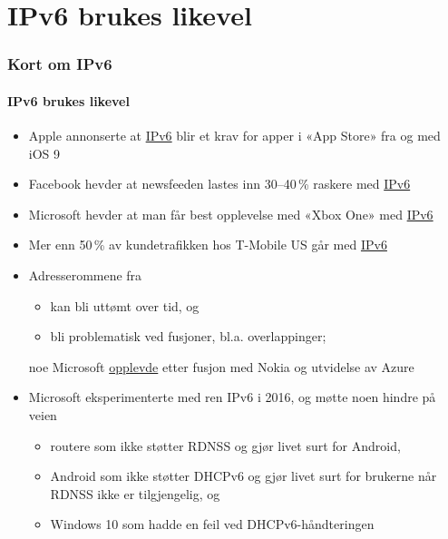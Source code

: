 \section{IPv6 brukes likevel}
\begin{frame}
  \frametitle{Kort om IPv6}
  \framesubtitle{IPv6 brukes likevel}
  \begin{itemize}
  \item Apple annonserte at
    \href{https://developer.apple.com/videos/wwdc/2015/?id=102}{IPv6}
    blir et krav for apper i «App Store» fra og med iOS 9
  \item Facebook hevder at newsfeeden lastes inn 30--40\,\% raskere
    med
    \href{https://www.youtube.com/watch?v=An7s25FSK0U&feature=youtu.be&t=18m54s}{IPv6}
  \item Microsoft hevder at man får best opplevelse med «Xbox One» med
    \href{http://www.internetsociety.org/deploy360/blog/2013/10/microsoft-the-best-xbox-one-gaming-experience-will-be-over-ipv6/}{IPv6}
  \item Mer enn 50\,\% av kundetrafikken hos T-Mobile US går med
    \href{https://conference.apnic.net/data/37/464xlat-apricot-2014_1393236641.pdf}{IPv6}
  \item Adresserommene fra 
    \begin{itemize}
    \item kan bli uttømt over tid, og
    \item bli problematisk ved fusjoner, bl.a. overlappinger;
    \end{itemize}
    noe Microsoft
    \href{https://blog.apnic.net/2017/01/19/ipv6-only-at-microsoft/}{opplevde}
    etter fusjon med Nokia og utvidelse av Azure
  \item Microsoft eksperimenterte med ren IPv6 i 2016, og møtte noen hindre på veien
    \begin{itemize}
    \item routere som ikke støtter RDNSS  og gjør livet
      surt for Android,
    \item Android som ikke støtter DHCPv6  og gjør livet
      surt for brukerne når RDNSS ikke er tilgjengelig, og
    \item Windows 10 som hadde en feil ved DHCPv6-håndteringen
    \end{itemize}
  \end{itemize}
\end{frame}

